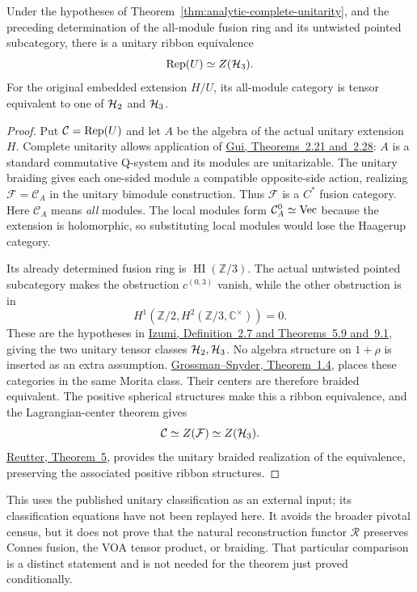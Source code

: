 \begin{theorem}
\label{thm:analytic-category}
Under the hypotheses of Theorem~\ref{thm:analytic-complete-unitarity},
and the preceding determination of the all-module fusion ring and its
untwisted pointed subcategory, there is a unitary ribbon equivalence
\[
 \Rep(U)\simeq Z(\HH_3).
\]
For the original embedded extension $H/U$, its all-module category is
tensor equivalent to one of $\HH_2$ and $\HH_3$.
\end{theorem}
\begin{proof}
Put $\mathcal C=\Rep(U)$ and let $A$ be the algebra of the actual
unitary extension $H$.  Complete unitarity allows application of
\href{https://arxiv.org/html/1908.03484#S2.SS4}
{Gui, Theorems~2.21 and~2.28}: $A$ is a standard commutative
Q-system and its modules are unitarizable.  The unitary braiding gives
each one-sided module a compatible opposite-side action, realizing
$\mathcal F=\mathcal C_A$ in the unitary bimodule construction.  Thus
$\mathcal F$ is a $C^*$ fusion category.  Here $\mathcal C_A$ means
\emph{all} modules.  The local modules form $\mathcal C_A^0\simeq\Vec$
because the extension is holomorphic, so substituting local modules
would lose the Haagerup category.

Its already determined fusion ring is
$\operatorname{HI}(\mathbb Z/3)$.  The actual untwisted pointed
subcategory makes the obstruction $c^{(0,3)}$ vanish, while the other
obstruction is in
\[
 H^1\!\left(\mathbb Z/2,H^2(\mathbb Z/3,\mathbb C^\times)\right)=0.
\]
These are the hypotheses in
\href{https://arxiv.org/html/1609.07604}
{Izumi, Definition~2.7 and Theorems~5.9 and~9.1}, giving the two
unitary tensor classes $\HH_2,\HH_3$.  No algebra structure on
$1+\rho$ is inserted as an extra assumption.
\href{https://arxiv.org/html/1102.2631#S1}
{Grossman--Snyder, Theorem~1.4}, places these categories in the same
Morita class.  Their centers are therefore braided equivalent.
The positive spherical structures make this a ribbon equivalence, and
the Lagrangian-center theorem gives
\[
 \mathcal C\simeq Z(\mathcal F)\simeq Z(\HH_3).
\]
\href{https://arxiv.org/html/1906.09710}
{Reutter, Theorem~5}, provides the unitary braided realization of the
equivalence, preserving the associated positive ribbon structures.
\end{proof}

This uses the published unitary classification as an external input;
its classification equations have not been replayed here.  It avoids
the broader pivotal census, but it does not prove that the natural
reconstruction functor $\mathcal R$ preserves Connes fusion, the VOA
tensor product, or braiding.  That particular comparison is a distinct
statement and is not needed for the theorem just proved conditionally.

